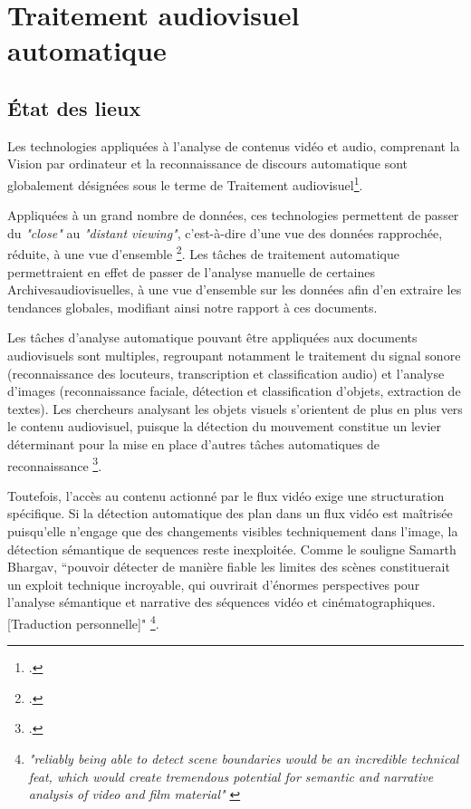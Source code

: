 \section{\label{II_1_A}Traitement audiovisuel automatique}


\subsection{État des lieux}

Les technologies appliquées à l'analyse de contenus vidéo et audio, comprenant la \gls{Vision par ordinateur} et la reconnaissance de discours automatique sont globalement désignées sous le terme de \gls{Traitement audiovisuel}\footcite{noord2021}.

Appliquées à un grand nombre de données, ces technologies permettent de passer du \textit{"close"} au \textit{"distant viewing"}, c’est-à-dire d’une vue des données rapprochée, réduite, à une vue d’ensemble \footcite{noord2021}. Les tâches de traitement automatique permettraient en effet de passer de l’analyse manuelle de certaines \gls{Archivesaudiovisuelles}, à une vue d'ensemble sur les données afin d'en extraire les tendances globales, modifiant ainsi notre rapport à ces documents. 

Les tâches d’analyse automatique pouvant être appliquées aux documents audiovisuels sont multiples, regroupant notamment le traitement du signal sonore (reconnaissance des locuteurs, transcription et classification audio) et l’analyse d’images (reconnaissance faciale, détection et classification d’objets, extraction de textes). Les chercheurs analysant les objets visuels s’orientent de plus en plus vers le contenu audiovisuel, puisque la détection du mouvement constitue un levier déterminant pour la mise en place d’autres tâches automatiques de reconnaissance \footcite{brostow2009}. 

Toutefois, l’accès au contenu actionné par le flux vidéo exige une structuration spécifique. Si la détection automatique des \gls{plan} dans un flux vidéo est maîtrisée puisqu’elle n’engage que des changements visibles techniquement dans l’image, la détection sémantique de \gls{sequence}s reste inexploitée. Comme le souligne Samarth Bhargav, “pouvoir détecter de manière fiable les limites des scènes constituerait un exploit technique incroyable, qui ouvrirait d'énormes perspectives pour l'analyse sémantique et narrative des séquences vidéo et cinématographiques. [Traduction personnelle]" \footnote{\textit{"reliably being able to detect scene boundaries would be an incredible technical feat, which would create tremendous potential for semantic and narrative analysis of video and film material"} \cite{bhargav2019}}.

